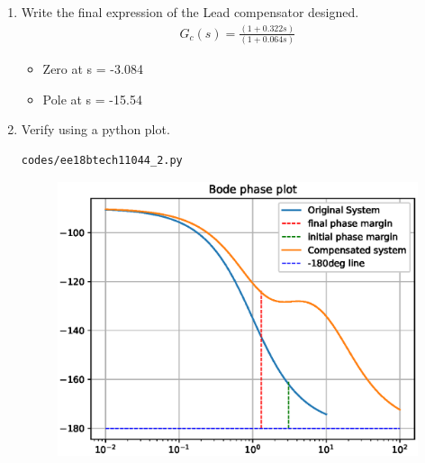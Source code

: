 \begin{enumerate}[label=\thesection.\arabic*.,ref=\thesection.\theenumi]
\item Write the final expression of the Lead compensator designed. \\
\solution
\begin{align}
    G_c(s) =   \frac{(1+ 0.322 s)}{(1+ 0.064 s)} 
\end{align}
\begin{itemize}
    \item Zero at s = -3.084
    \item Pole at s = -15.54
\end{itemize}
\item Verify using a python plot. \\
\solution
\begin{lstlisting}
codes/ee18btech11044_2.py
\end{lstlisting}

\begin{figure}[!ht]
\centering
\includegraphics[width=\columnwidth]{figs/ee18btech11044_2_1.eps}
\caption{}
\end{figure}
\end{enumerate}

